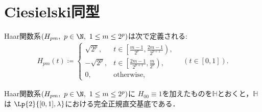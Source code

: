 \section{Ciesielski同型}
	\begin{screen}
		\begin{dfn}[Haar関数系]
			Haar関数系$(H_{pm},\ p \in \N,\ 1 \leq m \leq 2^p)$は次で定義される:
			\begin{align}
				H_{pm}(t) \coloneqq
				\begin{cases}
					\sqrt{2^p}, & t \in \left[ \frac{m-1}{2^p},\frac{2m-1}{2^{p+1}} \right), \\
					-\sqrt{2^p}, & t \in \left[ \frac{2m-1}{2^{p+1}},\frac{m}{2^p} \right), \\
					0, & \mathrm{otherwise},
				\end{cases}
				\quad (t \in [0,1]).
			\end{align}
		\end{dfn}
	\end{screen}
	
	\begin{screen}
		\begin{thm}
			Haar関数系$(H_{pm},\ p \in \N,\ 1 \leq m \leq 2^p)$に
			$H_{00} \equiv 1$を加えたものを$\mathbb{H}$とおくと，$\mathbb{H}$は
			$\Lp{2}{[0,1],\lambda}$における完全正規直交基底である．
			\label{thm:Haar_functions_orthonormal_basis}
		\end{thm}
	\end{screen}
	
